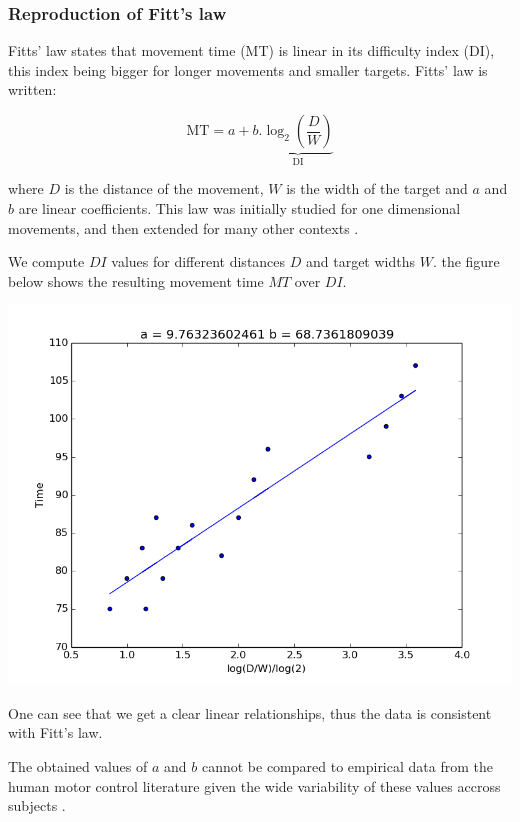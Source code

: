 \documentclass[pdftex,a4paper,11pt]{report}
\begin{document}
\subsubsection{Reproduction of Fitt's law}
Fitts' law states that movement time (MT) is linear in its difficulty index (DI), this index being bigger for longer movements and smaller targets. Fitts' law is written:

\begin{equation}
\text{MT} = a + b . \underbrace{\log_2\left(\frac{D}{W}\right)}_\text{DI}
\label{eq:fitts}
\end{equation}

where $D$ is the distance of the movement, $W$ is the width of the target and $a$ and $b$ are linear coefficients. This law was initially studied for one dimensional movements,
and then extended for many other contexts \cite{Soechting1984,Bootsma1994,Laurent1994,Plamondon1997,Smyrnis2000,Bootsma2004}.

We compute $DI$ values for different distances $D$ and target widths $W$. the figure below shows the resulting movement time $MT$ over $DI$.
\begin{center}
\includegraphics[scale=0.5]{figures/fittsLaw.png}
\end{center}
One can see that we get a clear linear relationships, thus the data is consistent with Fitt's law.

The obtained values of $a$ and $b$ cannot be compared to empirical data from the human motor control literature given the wide variability of these values accross subjects \cite{crossman1983,mackenzie1989}.
\end{document}
